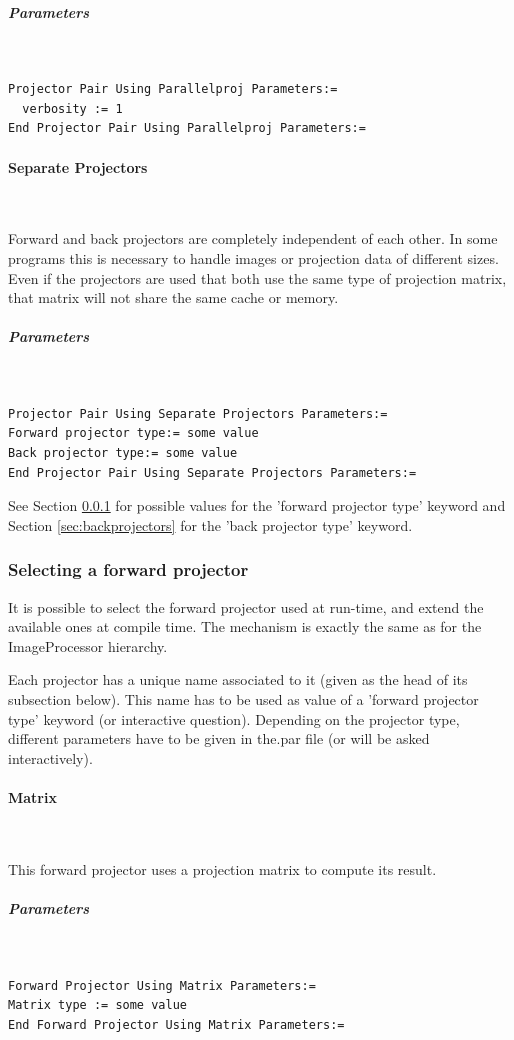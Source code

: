 \documentclass{article}
\newcommand{\subsubsubsection}[1]{\paragraph{#1}\mbox{} \\}
\newcommand{\subsubsubsubsection}[1]{\subparagraph{#1} \mbox{} \\}
\begin{document}
{{{ \subsubsubsubsection{Parameters}
}
\begin{verbatim}
Projector Pair Using Parallelproj Parameters:=
  verbosity := 1
End Projector Pair Using Parallelproj Parameters:=
\end{verbatim}

{ \subsubsubsection{Separate Projectors }
}
Forward and back projectors are completely independent of each 
other. In some programs this is necessary to handle images or 
projection data of different sizes. \\
Even if the projectors are used that both use the same type of 
projection matrix, that matrix will not share the same cache 
or memory.

{ \subsubsubsubsection{Parameters}
}
\begin{verbatim}
Projector Pair Using Separate Projectors Parameters:=
Forward projector type:= some value
Back projector type:= some value
End Projector Pair Using Separate Projectors Parameters:=
\end{verbatim}

See Section \ref{sec:forwardprojectors} for possible values for the 'forward projector 
type' keyword and Section \ref{sec:backprojectors} for the 'back projector type' 
keyword.


\subsubsection{
Selecting a forward projector}
\label{sec:forwardprojectors}
It is possible to select the forward projector used at run-time, 
and extend the available ones at compile time. The mechanism 
is exactly the same as for the ImageProcessor hierarchy.


Each projector has a unique name associated to it (given as the 
head of its subsection below). This name has to be used as value 
of a 'forward projector type' keyword (or interactive question). 
Depending on the projector type, different parameters have to 
be given in the.par file (or will be asked interactively).

{ \subsubsubsection{Matrix}
}
This forward projector uses a projection matrix to compute its 
result.

{ \subsubsubsubsection{Parameters}
}
\begin{verbatim}
Forward Projector Using Matrix Parameters:=
Matrix type := some value
End Forward Projector Using Matrix Parameters:=
\end{verbatim}

}}
\end{document}
